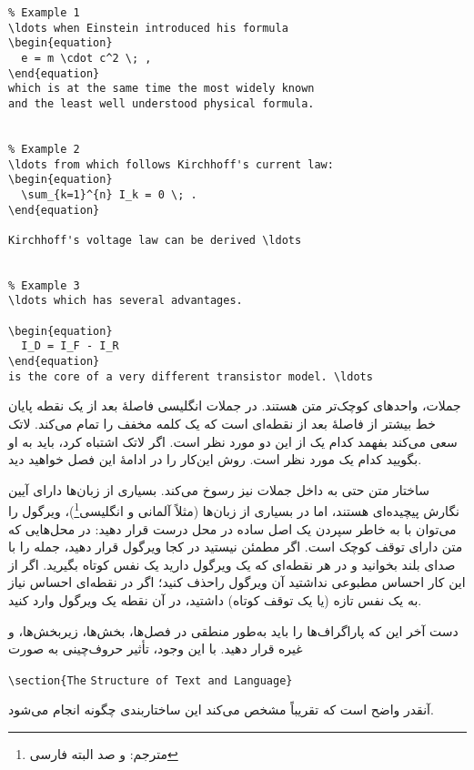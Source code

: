 \begin{code}
\begin{verbatim}
% Example 1
\ldots when Einstein introduced his formula 
\begin{equation} 
  e = m \cdot c^2 \; , 
\end{equation} 
which is at the same time the most widely known 
and the least well understood physical formula. 


% Example 2
\ldots from which follows Kirchhoff's current law:
\begin{equation} 
  \sum_{k=1}^{n} I_k = 0 \; .
\end{equation} 

Kirchhoff's voltage law can be derived \ldots


% Example 3
\ldots which has several advantages.

\begin{equation} 
  I_D = I_F - I_R
\end{equation} 
is the core of a very different transistor model. \ldots
\end{verbatim}
\end{code} 

جملات، واحدهای کوچک‌تر متن هستند. در جملات انگلیسی فاصلهٔ بعد از یک نقطه پایان خط بیشتر از فاصلهٔ بعد از نقطه‌ای است که یک کلمه مخفف را تمام می‌کند. 
لاتک سعی می‌کند بفهمد کدام یک از این دو مورد نظر است. اگر لاتک اشتباه کرد، باید به او بگویید کدام یک مورد نظر است. 
روش این‌کار را در ادامهٔ این فصل خواهید دید.

ساختار متن حتی به داخل جملات نیز رسوخ می‌کند. بسیاری از زبان‌ها دارای آیین نگارش پیچیده‌ای هستند، اما در بسیاری از زبان‌ها 
(مثلاً آلمانی و انگلیسی\footnote{مترجم: و صد البته فارسی})، 
ویرگول را می‌توان با به خاطر سپردن یک اصل ساده در محل درست قرار دهید: در محل‌هایی که متن دارای توقف کوچک است.
اگر مطمئن نیستید در کجا ویرگول قرار دهید، جمله را با صدای بلند بخوانید و در هر نقطه‌ای که یک ویرگول دارید یک نفس کوتاه بگیرید. اگر از این کار احساس مطبوعی نداشتید آن ویرگول راحذف کنید؛ اگر در نقطه‌ای احساس نیاز به یک نفس تازه 
(یا یک توقف کوتاه)
داشتید، در آن نقطه یک ویرگول وارد کنید.

دست آخر این که پاراگراف‌ها را باید به‌طور منطقی در فصل‌ها، بخش‌ها، زیربخش‌ها، و غیره قرار دهید. با این وجود، تأثیر حروف‌چینی به صورت  
\begin{code}
\verb|\section{The| \texttt{Structure of Text and Language}\verb|}| 
\end{code}
آنقدر واضح است که تقریباً مشخص می‌کند این ساختاربندی چگونه انجام می‌شود.
